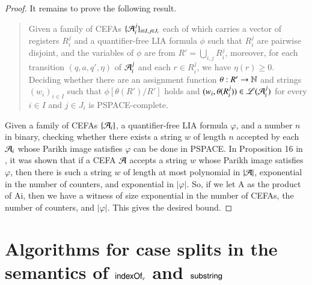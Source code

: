 \begin{proof}
\smallskip

It remains to prove the following result.
\begin{quote}
Given a family of CEFAs $\{ \mathcal{A}_i^{j} \}_{i\in I,j\in J_i}$ each of which carries a vector of registers $R_i^j$ and a quantifier-free LIA formula $\phi$ such that  $ R_i^{j} $ are pairwise disjoint,  and the variables of $\phi$ are from $R'=\bigcup_{i,j} R_i^j$, moreover, for each transition $(q, a, q', \eta)$ of $ \mathcal{A}_i^{j}$ and each $r \in R_i^j$, we have $\eta(r) \ge 0$. Deciding whether  
	there are an assignment function $\theta: R' \rightarrow \mathbb{N}$ and strings $(w_i)_{i \in I}$ such that  $\phi[\theta(R' )/R']$ holds and $(w_i, \theta(R_i^j)) \in \mathscr{L}(\mathcal{A}_{i}^j)$ for every $i \in I$ and $j \in J_i$ is PSPACE-complete.
\end{quote}



Given a family of CEFAs $\{\mathcal{A}_i\}$, a quantifier-free LIA formula $\varphi$, and a number $n$ in binary, checking whether there exists a string $w$ of length $n$ accepted by each $\mathcal{A}_i$ whose Parikh image satisfies $\varphi$ can be done in PSPACE. In Proposition 16 in \cite{LB16}, it was shown that if a CEFA $\mathcal{A}$ accepts a string $w$ whose Parikh image satisfies $\varphi$, then there is such a string $w$ of length at most polynomial in $|\mathcal{A}|$, exponential in the number of counters, and exponential in $|\varphi|$. So, if we let A as the product of {Ai}, then we have a witness of size exponential in the number of CEFAs, the number of counters, and $|\varphi|$. This gives the desired bound.
\end{proof}
\section{Algorithms for case splits in the semantics of $\mathsf{indexOf}_v$ and $\mathsf{substring}$}\label{app:case-split-semantics}

